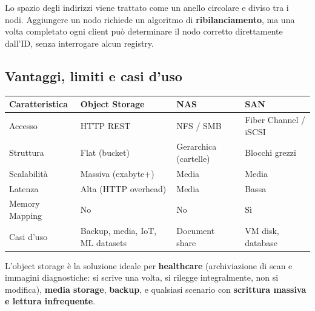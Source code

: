 \documentclass[
  italian,
  openany]{book}
\newcounter{none} %
\begin{document}
Lo spazio degli indirizzi viene trattato come un anello circolare e
diviso tra i nodi. Aggiungere un nodo richiede un algoritmo di
\textbf{ribilanciamento}, ma una volta completato ogni client può
determinare il nodo corretto direttamente dall'ID, senza interrogare
alcun registry.

\subsection{Vantaggi, limiti e casi
d'uso}\label{vantaggi-limiti-e-casi-duso}

{\def\LTcaptype{none} %
\begin{longtable}[]{@{}
  >{\raggedright\arraybackslash}p{}
  >{\raggedright\arraybackslash}p{}
  >{\raggedright\arraybackslash}p{}
  >{\raggedright\arraybackslash}p{}@{}}
\toprule\noalign{}
\begin{minipage}[b]{\linewidth}\raggedright
Caratteristica
\end{minipage} & \begin{minipage}[b]{\linewidth}\raggedright
Object Storage
\end{minipage} & \begin{minipage}[b]{\linewidth}\raggedright
NAS
\end{minipage} & \begin{minipage}[b]{\linewidth}\raggedright
SAN
\end{minipage} \\
\midrule\noalign{}
\endhead
\bottomrule\noalign{}
\endlastfoot
Accesso & HTTP REST & NFS / SMB & Fiber Channel / iSCSI \\
Struttura & Flat (bucket) & Gerarchica (cartelle) & Blocchi grezzi \\
Scalabilità & Massiva (exabyte+) & Media & Media \\
Latenza & Alta (HTTP overhead) & Media & Bassa \\
Memory Mapping & No & No & Sì \\
Casi d'uso & Backup, media, IoT, ML datasets & Document share & VM disk,
database \\
\end{longtable}
}

L'object storage è la soluzione ideale per \textbf{healthcare}
(archiviazione di scan e immagini diagnostiche: si scrive una volta, si
rilegge integralmente, non si modifica), \textbf{media storage},
\textbf{backup}, e qualsiasi scenario con \textbf{scrittura massiva e
lettura infrequente}.
\end{document}
